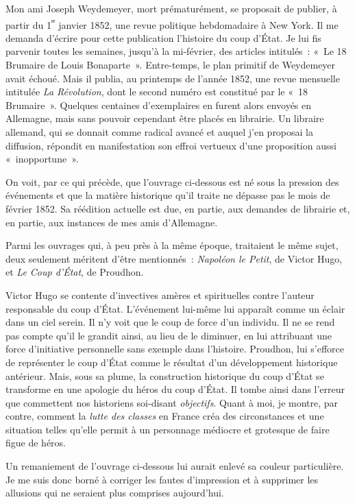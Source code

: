 \documentclass[french,twoside]{book} %
\begin{document}
\noindent Mon ami Joseph Weydemeyer, mort prématurément, se proposait de publier, à partir du 1\textsuperscript{ᵉʳ} janvier 1852, une revue politique hebdomadaire à New York. Il me demanda d’écrire pour cette publication l’histoire du coup d’État. Je lui fis parvenir toutes les semaines, jusqu’à la mi-février, des articles intitulés : « Le 18 Brumaire de Louis Bonaparte ». Entre-temps, le plan primitif de Weydemeyer avait échoué. Mais il publia, au printemps de l’année 1852, une revue mensuelle intitulée \emph{La Révolution}, dont le second numéro est constitué par le « 18 Brumaire ». Quelques centaines d’exemplaires en furent alors envoyés en Allemagne, mais sans pouvoir cependant être placés en librairie. Un libraire allemand, qui se donnait comme radical avancé et auquel j’en proposai la diffusion, répondit en manifestation son effroi vertueux d’une proposition aussi « inopportune ».\par
On voit, par ce qui précède, que l’ouvrage ci-dessous est né sous la pression des événements et que la matière historique qu’il traite ne dépasse pas le mois de février 1852. Sa réédition actuelle est due, en partie, aux demandes de librairie et, en partie, aux instances de mes amis d’Allemagne.\par
Parmi les ouvrages qui, à peu près à la même époque, traitaient le même sujet, deux seulement méritent d’être mentionnés : \emph{Napoléon le Petit}, de Victor Hugo, et \emph{Le Coup d’État}, de Proudhon.\par
Victor Hugo se contente d’invectives amères et spirituelles contre l’auteur responsable du coup d’État. L’événement lui-même lui apparaît comme un éclair dans un ciel serein. Il n’y voit que le coup de force d’un individu. Il ne se rend pas compte qu’il le grandit ainsi, au lieu de le diminuer, en lui attribuant une force d’initiative personnelle sans exemple dans l’histoire. Proudhon, lui s’efforce de représenter le coup d’État comme le résultat d’un développement historique antérieur. Mais, sous sa plume, la construction historique du coup d’État se transforme en une apologie du héros du coup d’État. Il tombe ainsi dans l’erreur que commettent nos historiens soi-disant \emph{objectifs}. Quant à moi, je montre, par contre, comment la \emph{lutte des classes} en France créa des circonstances et une situation telles qu’elle permit à un personnage médiocre et grotesque de faire figue de héros.\par
Un remaniement de l’ouvrage ci-dessous lui aurait enlevé sa couleur particulière. Je me suis donc borné à corriger les fautes d’impression et à supprimer les allusions qui ne seraient plus comprises aujourd’hui.\par
\end{document}
